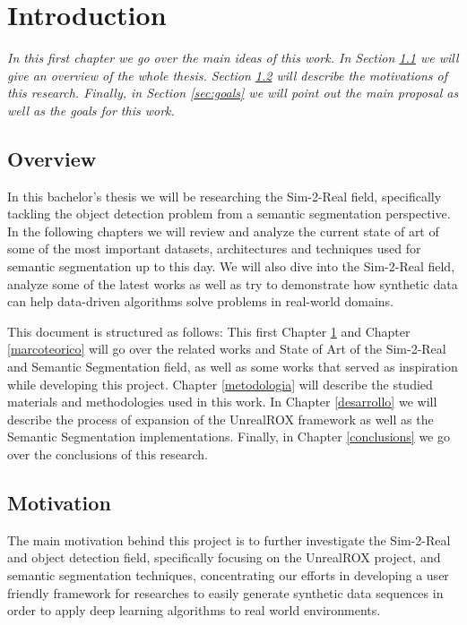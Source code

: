 
\chapter{Introduction}
\label{introduction}
\textit{In this first chapter we go over the main ideas of this work. In Section \ref{sec:overview} we will give an overview of the whole thesis. Section \ref{sec:motivation} will describe the motivations of this research. Finally, in Section \ref{sec:goals} we will point out the main proposal as well as the goals for this work.}

\section{Overview}
\label{sec:overview}
In this bachelor's thesis we will be researching the Sim-2-Real field, specifically tackling the object detection problem from a semantic segmentation perspective. In the following chapters we will review and analyze the current state of art of some of the most important datasets, architectures and techniques used for semantic segmentation up to this day. We will also dive into the Sim-2-Real field, analyze some of the latest works as well as try to demonstrate how synthetic data can help data-driven algorithms solve problems in real-world domains.

This document is structured as follows: This first Chapter \ref{introduction} and Chapter \ref{marcoteorico} will go over the related works and State of Art of the Sim-2-Real and Semantic Segmentation field, as well as some works that served as inspiration while developing this project. Chapter \ref{metodologia} will describe the studied materials and methodologies used in this work. In Chapter \ref{desarrollo} we will describe the process of expansion of the UnrealROX framework as well as the Semantic Segmentation implementations. Finally, in Chapter \ref{conclusions} we go over the conclusions of this research.

\section{Motivation}
\label{sec:motivation}
The main motivation behind this project is to further investigate the Sim-2-Real and object detection field, specifically focusing on the UnrealROX project, and semantic segmentation techniques, concentrating our efforts in developing a user friendly framework for researches to easily generate synthetic data sequences in order to apply deep learning algorithms to real world environments.

